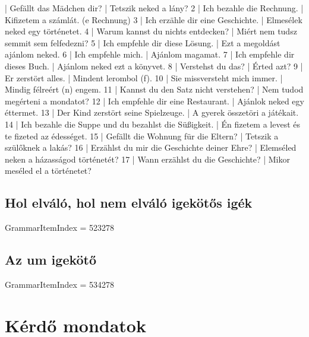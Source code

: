\documentclass{article}
\newenvironment{desc}{\verbatim}{\endverbatim}
\newenvironment{exmp}{\verbatim}{\endverbatim}
\begin{document}
\begin{exmp}
1 | Gefällt das Mädchen dir? | Tetszik neked a lány?
2 | Ich bezahle die Rechnung. | Kifizetem a számlát. (e Rechnung)
3 | Ich erzähle dir eine Geschichte. | Elmesélek neked egy történetet.
4 | Warum kannst du nichts entdecken? | Miért nem tudsz semmit sem felfedezni?
5 | Ich empfehle dir diese Lösung. | Ezt a megoldást ajánlom neked.
6 | Ich empfehle mich. | Ajánlom magamat.
7 | Ich empfehle dir dieses Buch. | Ajánlom neked ezt a könyvet.
8 | Verstehst du das? | Érted azt?
9 | Er zerstört alles. | Mindent lerombol (f).
10 | Sie missversteht mich immer. | Mindig félreért (n) engem.
11 | Kannst du den Satz nicht verstehen? | Nem tudod megérteni a mondatot?
12 | Ich empfehle dir eine Restaurant. | Ajánlok neked egy éttermet.
13 | Der Kind zerstört seine Spielzeuge. | A gyerek összetöri a játékait.
14 | Ich bezahle die Suppe und du bezahlst die Süßigkeit. | Én fizetem a levest és te fizeted az édességet.
15 | Gefällt die Wohnung für die Eltern? | Tetszik a szülőknek a lakás?
16 | Erzählst du mir die Geschichte deiner Ehre? | Elemséled neken a házasságod történetét?
17 | Wann erzählst du die Geschichte? | Mikor meséled el a történetet?
\end{exmp}

\subsection{Hol elváló, hol nem elváló igekötős igék}

GrammarItemIndex = 523278

\begin{desc}
\end{desc}

\begin{exmp}
\end{exmp}

\subsection{Az um igekötő}

GrammarItemIndex = 534278

\begin{desc}
\end{desc}

\begin{exmp}
\end{exmp}

\section{Kérdő mondatok}
\end{document}
